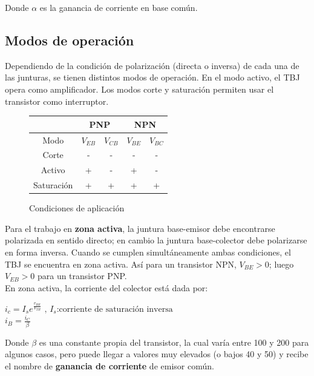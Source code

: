 \documentclass[oneside]{book}
\numberwithin{equation}{section}
\numberwithin{figure}{section}
\numberwithin{table}{section}
\begin{document}
			Donde $\alpha$ es la ganancia de corriente en base común.\\
			
			\subsection{Modos de operación}
			
				Dependiendo de la condición de polarización (directa o inversa) de cada una de las junturas, se tienen distintos modos de operación. En el modo activo, el TBJ opera como amplificador. Los modos corte y saturación permiten usar el transistor como interruptor.
				
				\begin{figure}[H]
					\begin{center}
						\begin{tabular}{|c|c|c|c|c|}
							\hline & \multicolumn{2}{c|}{PNP} & \multicolumn{2}{c|}{NPN} \\ 
							\hline Modo & $V_{EB}$ & $V_{CB}$ & $V_{BE}$ & $V_{BC}$ \\ 
							\hline Corte & - & - & - & - \\ 
							\hline Activo & + & - & + & - \\ 
							\hline Saturación & + & + & + & + \\ 
							\hline 
						\end{tabular} 
						\caption{Condiciones de aplicación}	
					\end{center}
				\end{figure}
			
				Para el trabajo en \textbf{zona activa}, la juntura base-emisor debe encontrarse polarizada en sentido directo; en cambio la juntura base-colector debe polarizarse en forma inversa. Cuando se cumplen simultáneamente ambas condiciones, el TBJ se encuentra en zona activa. Así para un transistor NPN, $V_{BE}>0$; luego $V_{EB}>0$ para un transistor PNP.\\
				
				En zona activa, la corriente del colector está dada por:
				
				\begin{center}
					$\displaystyle i_c=I_s e^{\frac{v_{BE}}{V_{TH}}} \text{ , } I_s \text{:corriente de saturación inversa}$\\
					$\displaystyle i_B=\frac{i_C}{\beta}$
				\end{center}
		
				Donde $\beta$ es una constante propia del transistor, la cual varía entre 100 y 200 para algunos casos, pero puede llegar a valores muy elevados (o bajos 40 y 50) y recibe el nombre de \textbf{ganancia de corriente} de emisor común.\\
				
\end{document}
